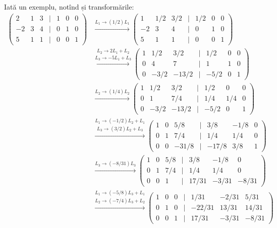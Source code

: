 Iată un exemplu, notînd și transformările:
\begin{align*}
  \begin{pmatrix}
    2 & 1 & 3 & \mid & 1 & 0 & 0 \\
    -2 & 3 & 4 & \mid & 0 & 1 & 0 \\
    5 & 1 & 1 & \mid & 0 & 0 & 1
  \end{pmatrix} &\xrightarrow{L_1 \to (1/2)L_1}
                  \begin{pmatrix}
                    1 & 1/2 & 3/2 & \mid & 1/2 & 0 & 0 \\
                    -2 & 3 & 4 & \mid & 0 & 1 & 0 \\
                    5 & 1 & 1 & \mid & 0 & 0 & 1 
                  \end{pmatrix} \\
      &\stackrel{L_2 \to 2L_1 + L_2}{\xrightarrow{L_3 \to -5L_1 + L_3}}
        \begin{pmatrix}
          1 & 1/2 & 3/2 & \mid & 1/2 & 0 & 0 \\
          0 & 4 & 7 & \mid & 1 & 1 & 0 \\
          0 & -3/2 & -13/2 & \mid & -5/2 & 0 & 1
        \end{pmatrix} \\
      &\xrightarrow{L_2 \to (1/4)L_2}
        \begin{pmatrix}
          1 & 1/2 & 3/2 & \mid & 1/2 & 0 & 0 \\
          0 & 1 & 7/4 & \mid & 1/4 & 1/4 & 0 \\
          0 & -3/2 & -13/2 & \mid & -5/2 & 0 & 1 
        \end{pmatrix} \\
      &\stackrel{L_1 \to (-1/2)L_2 + L_1}{\xrightarrow{L_3 \to (3/2)L_2 + L_3}}
        \begin{pmatrix}
          1 & 0 & 5/8 & \mid & 3/8 & -1/8 & 0 \\
          0 & 1 & 7/4 & \mid & 1/4 & 1/4 & 0 \\
          0 & 0 & -31/8 & \mid & -17/8 & 3/8 & 1
        \end{pmatrix} \\
      &\xrightarrow{L_3 \to (-8/31)L_3}
        \begin{pmatrix}
          1 & 0 & 5/8 & \mid & 3/8 & -1/8 & 0 \\
          0 & 1 & 7/4 & \mid & 1/4 & 1/4 & 0 \\
          0 & 0 & 1 & \mid & 17/31 & -3/31 & -8/31
        \end{pmatrix} \\
      &\stackrel{L_1 \to (-5/8)L_3 + L_1}{\xrightarrow{L_2 \to (-7/4)L_3 + L_2}}
        \begin{pmatrix}
          1 & 0 & 0 & \mid & 1/31 & -2/31 & 5/31 \\
          0 & 1 & 0 & \mid & -22/31 & 13/31 & 14/31 \\
          0 & 0 & 1 & \mid & 17/31 & -3/31 & -8/31
        \end{pmatrix}
\end{align*}

